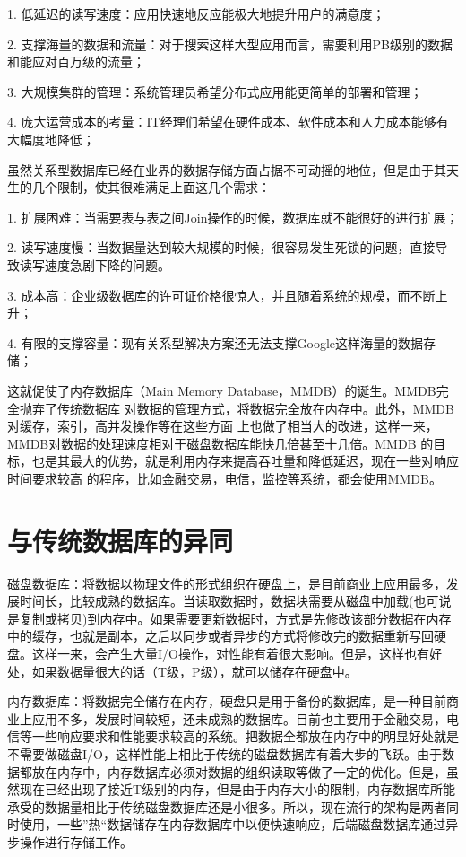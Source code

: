 \documentclass[literaturereview]{zjutreport}
\begin{document}
1. 低延迟的读写速度：应用快速地反应能极大地提升用户的满意度；

2. 支撑海量的数据和流量：对于搜索这样大型应用而言，需要利用PB级别的数据和能应对百万级的流量；

3. 大规模集群的管理\cite{ref:2}：系统管理员希望分布式应用能更简单的部署和管理；

4. 庞大运营成本的考量：IT经理们希望在硬件成本、软件成本和人力成本能够有大幅度地降低；

虽然关系型数据库已经在业界的数据存储方面占据不可动摇的地位，但是由于其天生的几个限制，使其很难满足上面这几个需求：

1. 扩展困难：当需要表与表之间Join操作的时候，数据库就不能很好的进行扩展；

2. 读写速度慢：当数据量达到较大规模的时候，很容易发生死锁的问题，直接导致读写速度急剧下降的问题。

3. 成本高：企业级数据库的许可证价格很惊人，并且随着系统的规模，而不断上升；

4. 有限的支撑容量：现有关系型解决方案还无法支撑Google这样海量的数据存储；

这就促使了内存数据库\cite{ref:3}（Main Memory Database，MMDB）的诞生。MMDB完全抛弃了传统数据库
对数据的管理方式，将数据完全放在内存中。此外，MMDB对缓存，索引，高并发操作等在这些方面
上也做了相当大的改进，这样一来，MMDB对数据的处理速度相对于磁盘数据库能快几倍甚至十几倍。MMDB
的目标，也是其最大的优势，就是利用内存来提高吞吐量和降低延迟，现在一些对响应时间要求较高
的程序，比如金融交易\cite{ref:4}，电信，监控等系统，都会使用MMDB。

\chapter{与传统数据库的异同}
磁盘数据库：将数据以物理文件的形式组织在硬盘上，是目前商业上应用最多，发展时间长，比较成熟的数据库。当读取数据时，数据块需要从磁盘中加载(也可说是复制或拷贝)到内存中。如果需要更新数据时，方式是先修改该部分数据在内存中的缓存，也就是副本，之后以同步或者异步的方式将修改完的数据重新写回硬盘。这样一来，会产生大量I/O操作，对性能有着很大影响。但是，这样也有好处，如果数据量很大的话（T级，P级），就可以储存在硬盘中。

内存数据库：将数据完全储存在内存，硬盘只是用于备份的数据库，是一种目前商业上应用不多，发展时间较短，还未成熟的数据库。目前也主要用于金融交易，电信\cite{ref:5}等一些响应要求和性能要求较高的系统。把数据全都放在内存中的明显好处就是不需要做磁盘I/O，这样性能上相比于传统的磁盘数据库有着大步的飞跃。由于数据都放在内存中，内存数据库必须对数据的组织读取等做了一定的优化。但是，虽然现在已经出现了接近T级别的内存，但是由于内存大小的限制，内存数据库所能承受的数据量相比于传统磁盘数据库还是小很多。所以，现在流行的架构是两者同时使用，一些”热“数据储存在内存数据库中以便快速响应，后端磁盘数据库通过异步操作进行存储工作。
\end{document}
